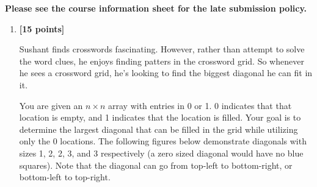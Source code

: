 \documentclass{assignment-373}
\begin{document}
\think

\textbf{Please see the course information sheet for the late submission
  policy.}

\begin{enumerate}
\item \textbf{[15 points]}

  Sushant finds crosswords fascinating. However, rather than attempt
  to solve the word clues, he enjoys finding patters in the crossword
  grid.
  So whenever he sees a crossword grid, he's
  looking to find the biggest diagonal he can fit in it.

  You are given an $n \times n$ array with entries in 0 or 1. 0
  indicates that that location is empty, and 1 indicates that the
  location is filled. Your goal is to determine the largest diagonal
  that can be filled in the grid while utilizing only the 0
  locations. The following figures below demonstrate diagonals with
  sizes 1, 2, 2, 3, and 3 respectively (a zero sized diagonal would have no
  blue squares). Note that the diagonal can go from top-left to
  bottom-right, or bottom-left to top-right.
  
  \begin{minipage}{1cm}
  \end{minipage}
  \begin{minipage}{2cm}
  \end{minipage}
%  
  \begin{minipage}{2cm}
    \begin{tikzpicture}
      [%
      box/.style={rectangle,draw=black,thick, minimum size=0.6cm},
      ]%
      

\end{tikzpicture}
\end{minipage}
\end{enumerate}
\end{document}

